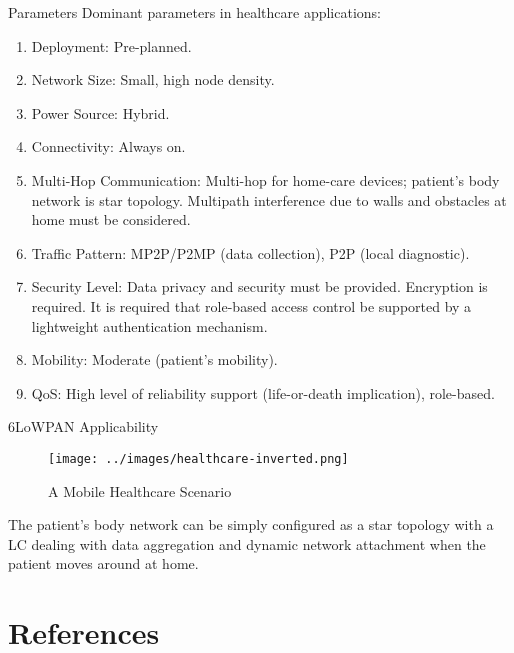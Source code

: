 \documentclass[10pt]{beamer}
\begin{document}
\begin{frame}{Parameters}
    Dominant parameters in healthcare applications\cite{rfc6568}:
    \begin{enumerate}
        \item Deployment: Pre-planned.
        \item Network Size: Small, high node density.
        \item Power Source: Hybrid.
        \item Connectivity: Always on.
        \item Multi-Hop Communication: Multi-hop for home-care devices; patient’s body network is star topology. Multipath interference due to walls and obstacles at home must be considered.
        \item Traffic Pattern: MP2P/P2MP (data collection), P2P (local diagnostic).
        \item Security Level: Data privacy and security must be provided. Encryption is required. It is required that role-based access control be supported by a lightweight authentication mechanism.
        \item Mobility: Moderate (patient’s mobility).
        \item QoS: High level of reliability support (life-or-death implication), role-based.
    \end{enumerate}
\end{frame}

\begin{frame}{6LoWPAN Applicability}
    \begin{figure}[htpb]
        \centering
        \texttt{[image: ../images/healthcare-inverted.png]}
        \caption{A Mobile Healthcare Scenario\cite{rfc6568}}
    \end{figure}
    The patient’s body network can be simply configured as a star topology with a LC dealing with data aggregation and dynamic network attachment when the patient moves around at home.\cite{rfc6568}
\end{frame}

\section*{References}


\end{document}
